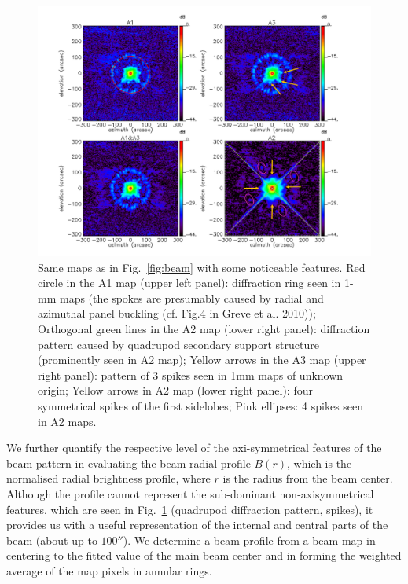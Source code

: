 \begin{figure}[!thbp]
\begin{center}
  \includegraphics[trim=0cm 0cm 1cm 0cm, clip=true, width=\linewidth]{Figures/Beams_features.pdf}
\caption[Noticeable features of NIKA2 beam pattern.]{Same maps as in
  Fig.~\ref{fig:beam} with some noticeable features. Red circle in the
  A1 map (upper left panel): diffraction ring seen in 1-mm maps
  (the spokes are presumably caused by radial and azimuthal panel buckling (cf. Fig.4 in Greve et
  al. 2010)); Orthogonal green lines in the A2 map (lower right panel): diffraction
  pattern caused by quadrupod secondary support structure (prominently
  seen in A2 map); Yellow arrows in the A3 map (upper right panel):
  pattern of 3 spikes seen in 1mm maps of unknown origin; Yellow
  arrows in A2 map (lower right panel): four symmetrical spikes of the
  first sidelobes; Pink ellipses: 4 spikes seen in A2 maps.}
\label{fig:features}
\end{center}
\end{figure}

We further quantify the respective level of the axi-symmetrical
features of the beam pattern in evaluating the beam radial profile
$B(r)$, which is the normalised radial brightness profile,
where $r$ is the radius from the beam center.
Although the profile cannot represent the sub-dominant non-axisymmetrical
features, which are seen in Fig.~\ref{fig:features} (quadrupod
diffraction pattern, spikes), it provides us with a useful
representation of the internal and central parts of the beam (about up to
$100''$). We determine a beam profile from a beam map in centering to
the fitted value of the main beam center and in forming the
weighted average of the map pixels in annular rings.

